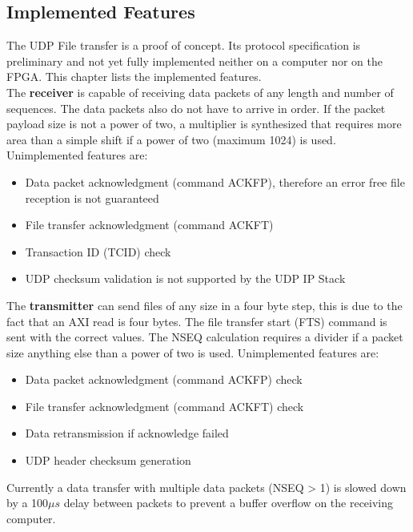 %
%
\subsection{Implemented Features}
The UDP File transfer is a proof of concept. Its protocol specification is
preliminary and not yet fully implemented neither on a computer nor on the
FPGA. This chapter lists the implemented features.
\\

The \textbf{receiver} is capable of receiving data packets of any length and
number of sequences. The data packets also do not have to arrive in order.
If the packet payload size is not a power of two, a
multiplier is synthesized that requires more area than a simple shift if a power
of two (maximum 1024) is used. Unimplemented features are:
\begin{itemize}
    \item Data packet acknowledgment (command ACKFP), therefore an error free
    file reception is not guaranteed
    \item File transfer acknowledgment (command ACKFT)
    \item Transaction ID (TCID) check
    \item UDP checksum validation is not supported by the UDP IP Stack
\end{itemize}

The \textbf{transmitter} can send files of any size in a four byte step, this is
due to the fact that an AXI read is four bytes. The file transfer start (FTS)
command is sent with the correct values. The NSEQ calculation requires a
divider if a packet size anything else than a power of two is used.
Unimplemented features are:
\begin{itemize}
    \item Data packet acknowledgment (command ACKFP) check
    \item File transfer acknowledgment (command ACKFT) check
    \item Data retransmission if acknowledge failed
    \item UDP header checksum generation
\end{itemize}
Currently a data transfer with multiple data packets (NSEQ > 1) is slowed down
by a 100$\mu s$ delay between packets to prevent a buffer overflow on the
receiving
computer.




